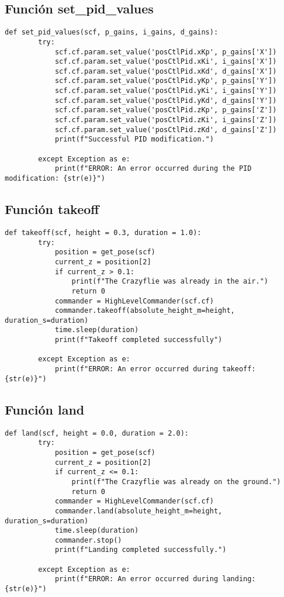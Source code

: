 \newpage
\subsection{Función set\_pid\_values}
\begin{lstlisting}[caption=Función en Python para configurar todos los PID de posición del Crazyflie., label=code:funcion_set_pid_values]
	def set_pid_values(scf, p_gains, i_gains, d_gains):
		try:       
			scf.cf.param.set_value('posCtlPid.xKp', p_gains['X'])
			scf.cf.param.set_value('posCtlPid.xKi', i_gains['X'])
			scf.cf.param.set_value('posCtlPid.xKd', d_gains['X'])
			scf.cf.param.set_value('posCtlPid.yKp', p_gains['Y'])
			scf.cf.param.set_value('posCtlPid.yKi', i_gains['Y'])
			scf.cf.param.set_value('posCtlPid.yKd', d_gains['Y'])
			scf.cf.param.set_value('posCtlPid.zKp', p_gains['Z'])
			scf.cf.param.set_value('posCtlPid.zKi', i_gains['Z'])
			scf.cf.param.set_value('posCtlPid.zKd', d_gains['Z'])
			print(f"Successful PID modification.")
		
		except Exception as e:
			print(f"ERROR: An error occurred during the PID modification: {str(e)}")
\end{lstlisting}

\subsection{Función takeoff}
\begin{lstlisting}[caption=Función en Python para despegar al Crazyflie., label=code:funcion_takeoff]
	def takeoff(scf, height = 0.3, duration = 1.0):
		try:
			position = get_pose(scf)
			current_z = position[2]  
			if current_z > 0.1:
				print(f"The Crazyflie was already in the air.")
				return 0
			commander = HighLevelCommander(scf.cf)
			commander.takeoff(absolute_height_m=height, duration_s=duration)
			time.sleep(duration)
			print(f"Takeoff completed successfully")
		
		except Exception as e:
			print(f"ERROR: An error occurred during takeoff: {str(e)}")
\end{lstlisting}

\newpage
\subsection{Función land}
\begin{lstlisting}[caption=Función en Python para aterrizar al Crazyflie., label=code:funcion_land]
	def land(scf, height = 0.0, duration = 2.0):
		try:
			position = get_pose(scf)
			current_z = position[2]  
			if current_z <= 0.1:
				print(f"The Crazyflie was already on the ground.")
				return 0
			commander = HighLevelCommander(scf.cf)
			commander.land(absolute_height_m=height, duration_s=duration)
			time.sleep(duration)
			commander.stop()
			print(f"Landing completed successfully.")
		
		except Exception as e:
			print(f"ERROR: An error occurred during landing: {str(e)}")
\end{lstlisting}

